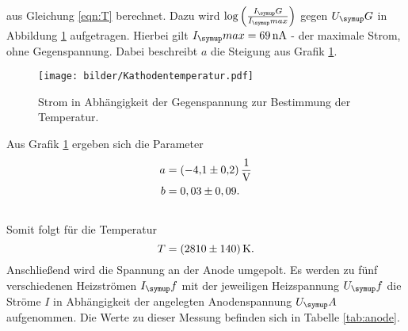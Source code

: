 aus Gleichung \eqref{eqn:T} berechnet.
Dazu wird $\log{\left(\frac{I_\su{G}}{I_\su{max}}\right)}$ gegen $U_\su{G}$ in Abbildung \ref{fig:g} aufgetragen.
Hierbei gilt $I_\su{max} = \SI{69}{\nano\ampere}$ - der maximale Strom, ohne Gegenspannung. Dabei beschreibt
$a$ die Steigung aus Grafik \ref{fig:g}.
\begin{figure}[H]
  \centering
  \texttt{[image: bilder/Kathodentemperatur.pdf]}
  \caption{Strom in Abhängigkeit der Gegenspannung zur Bestimmung der Temperatur.}
  \label{fig:g}
\end{figure}
Aus Grafik \ref{fig:g} ergeben sich die Parameter
\begin{align}
  a &= \SI[per-mode=fraction]{-4,1\pm0,2}{\per\volt}\\ \notag
  b &= 0,03\pm0,09.\\ \notag
\end{align}
Somit folgt für die Temperatur
\begin{equation}
  T = \SI{2810\pm140}{\kelvin}. \notag
\end{equation}
Anschließend wird die Spannung an der Anode umgepolt. Es werden zu fünf verschiedenen
Heizströmen $I_\su{f}$ mit der jeweiligen Heizspannung $U_\su{f}$ die Ströme $I$
in Abhängigkeit der angelegten Anodenspannung $U_\su{A}$ aufgenommen.
Die Werte zu dieser Messung befinden sich in Tabelle \ref{tab:anode}.
